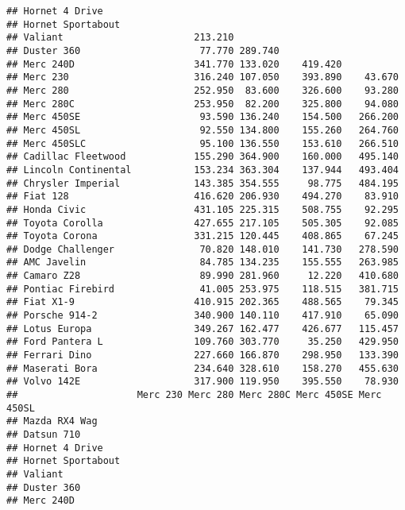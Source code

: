 \documentclass[]{book}
\begin{document}
\begin{verbatim}
## Hornet 4 Drive                                                    
## Hornet Sportabout                                                 
## Valiant                       213.210                             
## Duster 360                     77.770 289.740                     
## Merc 240D                     341.770 133.020    419.420          
## Merc 230                      316.240 107.050    393.890    43.670
## Merc 280                      252.950  83.600    326.600    93.280
## Merc 280C                     253.950  82.200    325.800    94.080
## Merc 450SE                     93.590 136.240    154.500   266.200
## Merc 450SL                     92.550 134.800    155.260   264.760
## Merc 450SLC                    95.100 136.550    153.610   266.510
## Cadillac Fleetwood            155.290 364.900    160.000   495.140
## Lincoln Continental           153.234 363.304    137.944   493.404
## Chrysler Imperial             143.385 354.555     98.775   484.195
## Fiat 128                      416.620 206.930    494.270    83.910
## Honda Civic                   431.105 225.315    508.755    92.295
## Toyota Corolla                427.655 217.105    505.305    92.085
## Toyota Corona                 331.215 120.445    408.865    67.245
## Dodge Challenger               70.820 148.010    141.730   278.590
## AMC Javelin                    84.785 134.235    155.555   263.985
## Camaro Z28                     89.990 281.960     12.220   410.680
## Pontiac Firebird               41.005 253.975    118.515   381.715
## Fiat X1-9                     410.915 202.365    488.565    79.345
## Porsche 914-2                 340.900 140.110    417.910    65.090
## Lotus Europa                  349.267 162.477    426.677   115.457
## Ford Pantera L                109.760 303.770     35.250   429.950
## Ferrari Dino                  227.660 166.870    298.950   133.390
## Maserati Bora                 234.640 328.610    158.270   455.630
## Volvo 142E                    317.900 119.950    395.550    78.930
##                     Merc 230 Merc 280 Merc 280C Merc 450SE Merc 450SL
## Mazda RX4 Wag                                                        
## Datsun 710                                                           
## Hornet 4 Drive                                                       
## Hornet Sportabout                                                    
## Valiant                                                              
## Duster 360                                                           
## Merc 240D                                                            

\end{verbatim}
\end{document}
